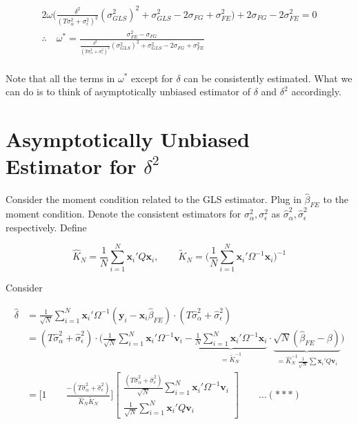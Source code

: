 \documentclass[11pt]{article}
\begin{document}
\begin{align*}
2\omega \bigg( \frac{\delta^2}{(T\sigma_\alpha^2+\sigma_\epsilon^2)^2} (\sigma_{GLS}^2)^2 + \sigma_{GLS}^2 - 2\sigma_{FG} +\sigma_{FE}^2 \bigg ) + 2\sigma_{FG} - 2\sigma_{FE}^2 =0\\
\therefore \quad \omega^{*} = \frac{\sigma_{FE}^2-\sigma_{FG}}{\frac{\delta^2}{(T\sigma_\alpha^2+\sigma_\epsilon^2)^2} (\sigma_{GLS}^2)^2 + \sigma_{GLS}^2 - 2\sigma_{FG} +\sigma_{FE}^2}\\
\end{align*}



Note that all the terms in $\omega^{*}$ except for $\delta$ can be consistently estimated. What we can do is to think of asymptotically unbiased estimator of $\delta$ and $\delta^2$ accordingly.

\section*{Asymptotically Unbiased Estimator for $\delta^2$}

Consider the moment condition related to the GLS estimator. Plug in $\widehat{\beta}_{FE}$ to the moment condition. Denote the consistent estimators for $\sigma_\alpha^2, \sigma_\epsilon^2$ as $\widehat{\sigma}_\alpha^2, \widehat{\sigma}_\epsilon^2$ respectively. Define 

\[
\widehat{K}_N = \frac{1}{N} \sum_{i=1}^N \mathbf{x}_i' Q \mathbf{x}_i, \qquad \widetilde{K}_N = \bigg( \frac{1}{N}\sum_{i=1}^N \mathbf{x}_i' \Omega^{-1} \mathbf{x}_i \bigg)^{-1}
\]

Consider

\begin{align*}
\widehat{\delta} & = \frac{1}{\sqrt{N}} \sum_{i=1}^N \mathbf{x}_i' \Omega^{-1} (\mathbf{y}_i - \mathbf{x}_i \widehat{\beta}_{FE}) \cdot( T\widehat{\sigma}_\alpha^2 + \widehat{\sigma}_\epsilon^2)\\
&= (T\widehat{\sigma}_\alpha^2 + \widehat{\sigma}_\epsilon^2)\cdot \bigg (\frac{1}{\sqrt{N}} \sum_{i=1}^N \mathbf{x}_i' \Omega^{-1} \mathbf{v}_i - \underbrace{\frac{1}{N} \sum_{i=1}^N \mathbf{x}_i' \Omega^{-1} \mathbf{x}_i}_{= \widetilde{K}_N^{-1}} \cdot \underbrace{\sqrt{N}(\widehat{\beta}_{FE}-\beta)}_{=\widehat{K}_N^{-1} \frac{1}{\sqrt{N}}\sum \mathbf{x}_i' Q \mathbf{v}_i} \bigg)\\
&=  \bigg [1 \qquad \frac{-(T\widehat{\sigma}_\alpha^2 + \widehat{\sigma}_\epsilon^2)}{\widehat{K}_N\widetilde{K}_N} \bigg ]  \begin{bmatrix}
\frac{(T\widehat{\sigma}_\alpha^2 + \widehat{\sigma}_\epsilon^2)}{\sqrt{N}} \sum_{i=1}^N \mathbf{x}_i' \Omega^{-1} \mathbf{v}_i  \\
\frac{1}{\sqrt{N}} \sum_{i=1}^N \mathbf{x}_i' Q \mathbf{v}_i  
\end{bmatrix}  \qquad \ldots (***)\\
\end{align*}
\end{document}
